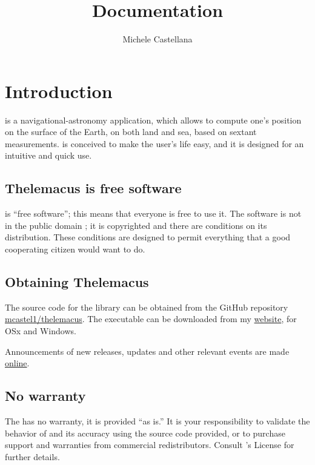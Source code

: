\documentclass{ol-softwaremanual}
\title{Documentation}
\author{Michele Castellana}
\begin{document}
\maketitle

\tableofcontents
\newpage

\section{Introduction}


\thel  is a navigational-astronomy application, which allows to compute one's position on the surface of the Earth, on both land and sea, based on sextant measurements. \thel is conceived to make the user's life easy, and it is designed for an intuitive and quick use. 

\subsection{Thelemacus is free software}

\thel is ``free software''; this means that everyone is free to use it. The software is not in the public domain \cite{castellana2024thelemacus}; it is copyrighted and there are conditions on its distribution. These conditions are designed to permit everything that a good cooperating citizen would want to do.

\subsection{Obtaining Thelemacus}

The source code for the library can be obtained from the GitHub repository \href{https://github.com/mcastel1/thelemacus}{mcastel1/thelemacus}. The executable can be downloaded from my \href{https://sites.google.com/site/michelecastellana/home}{website}, for OSx and Windows.  

Announcements of new releases, updates and other relevant events are made \href{https://sites.google.com/site/michelecastellana/home}{online}. 

\subsection{No warranty}

The \thel has no warranty, it is provided ``as is.'' It is your responsibility to validate the behavior of \thel and its accuracy using the source code provided, or to purchase support and warranties from commercial redistributors. Consult \thel's  License for further details.


\printacronyms[pages={display=none,seq/use=false}]




\end{document}
